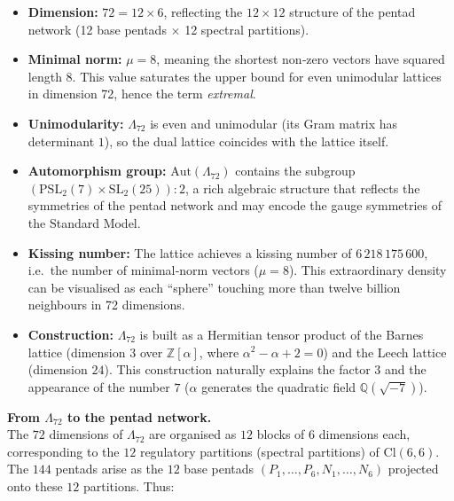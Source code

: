 \documentclass[11pt]{article}
\providecommand{\tightlist}{\setlength{\itemsep}{2pt}\setlength{\parskip}{6pt}}
\providecommand{\tightlist}{%
  \setlength{\itemsep}{2pt}\setlength{\parskip}{6pt}
}
\begin{document}
\begin{itemize}
\tightlist
\item
  \textbf{Dimension:} \(72 = 12 \times 6\), reflecting the
  \(12 \times 12\) structure of the pentad network (12 base pentads
  \(\times\) 12 spectral partitions).\\
\item
  \textbf{Minimal norm:} \(\mu = 8\), meaning the shortest non‑zero
  vectors have squared length \(8\). This value saturates the upper
  bound for even unimodular lattices in dimension 72, hence the term
  \emph{extremal}.\\
\item
  \textbf{Unimodularity:} \(\Lambda_{72}\) is even and unimodular (its
  Gram matrix has determinant \(1\)), so the dual lattice coincides with
  the lattice itself.\\
\item
  \textbf{Automorphism group:} \(\mathrm{Aut}(\Lambda_{72})\) contains
  the subgroup \((\mathrm{PSL}_2(7) \times \mathrm{SL}_2(25)):2\), a
  rich algebraic structure that reflects the symmetries of the pentad
  network and may encode the gauge symmetries of the Standard Model.\\
\item
  \textbf{Kissing number:} The lattice achieves a kissing number of
  \(6\,218\,175\,600\), i.e.~the number of minimal‑norm vectors
  (\(\mu=8\)). This extraordinary density can be visualised as each
  ``sphere'' touching more than twelve billion neighbours in 72
  dimensions.\\
\item
  \textbf{Construction:} \(\Lambda_{72}\) is built as a Hermitian tensor
  product of the Barnes lattice (dimension \(3\) over
  \(\mathbb{Z}[\alpha]\), where \(\alpha^2 - \alpha + 2 = 0\)) and the
  Leech lattice (dimension \(24\)). This construction naturally explains
  the factor \(3\) and the appearance of the number \(7\) (\(\alpha\)
  generates the quadratic field \(\mathbb{Q}(\sqrt{-7})\)).
\end{itemize}

\textbf{From \(\Lambda_{72}\) to the pentad network.}\\
The \(72\) dimensions of \(\Lambda_{72}\) are organised as \(12\) blocks
of \(6\) dimensions each, corresponding to the \(12\) regulatory
partitions (spectral partitions) of \(\mathrm{Cl}(6,6)\). The \(144\)
pentads arise as the \(12\) base pentads
\((P_1,\dots,P_6,N_1,\dots,N_6)\) projected onto these \(12\)
partitions. Thus:
\end{document}
